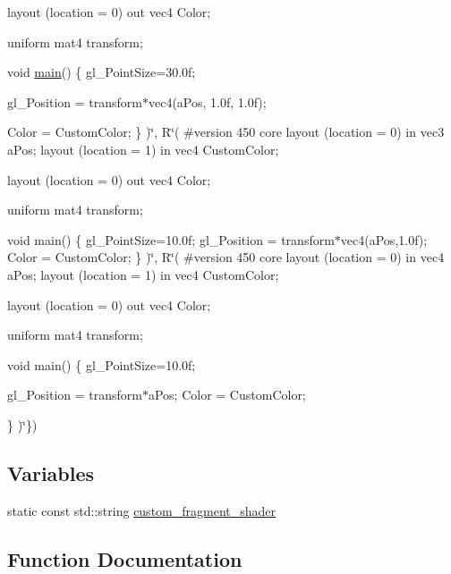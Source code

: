 \begin{DoxyCompactItemize}
layout (location = 0) out vec4 Color;

uniform mat4 transform;

void \mbox{\hyperlink{gtest__tests_8cpp_a3c04138a5bfe5d72780bb7e82a18e627}{main}}()
\{
gl\+\_\+\+Point\+Size=30.\+0f;

gl\+\_\+\+Position = transform$\ast$vec4(a\+Pos, 1.\+0f, 1.\+0f);

\+Color = Custom\+Color;
\}
)\char`\"{}, R\char`\"{}(
\#version 450 core
layout (location = 0) in vec3 a\+Pos;
layout (location = 1) in vec4 Custom\+Color;

layout (location = 0) out vec4 Color;

uniform mat4 transform;

void main()
\{
gl\+\_\+\+Point\+Size=10.\+0f;
gl\+\_\+\+Position = transform$\ast$vec4(a\+Pos,1.\+0f);
\+Color = Custom\+Color;
\}
)\char`\"{}, R\char`\"{}(
\#version 450 core
layout (location = 0) in vec4 a\+Pos;
layout (location = 1) in vec4 Custom\+Color;

layout (location = 0) out vec4 Color;

uniform mat4 transform;

void main()
\{
gl\+\_\+\+Point\+Size=10.\+0f;

gl\+\_\+\+Position = transform$\ast$a\+Pos;
\+Color = Custom\+Color;

\}
)\char`\"{}\})
\end{DoxyCompactItemize}
\subsection*{Variables}
\begin{DoxyCompactItemize}
\item 
static const std\+::string \mbox{\hyperlink{namespaceshaders_acea5f97c6eee2604b26ca2c01a42018b}{custom\+\_\+fragment\+\_\+shader}}
\end{DoxyCompactItemize}


\subsection{Function Documentation}
\mbox{\label{namespaceshaders_aaad8fe3689b4c2c8c80d89acf3a2c830}} 
